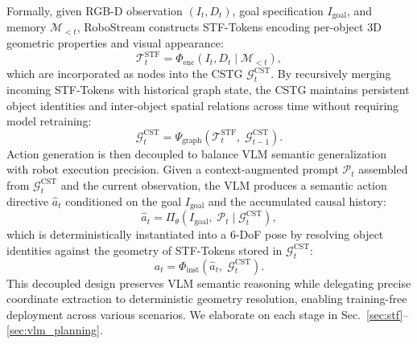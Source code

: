 Formally, given RGB-D observation $(I_t, D_t)$, goal specification $I_{\text{goal}}$, and memory $\mathcal{M}_{<t}$, RoboStream constructs STF-Tokens encoding per-object 3D geometric properties and visual appearance:
\begin{equation}
    \mathcal{T}_t^{\text{STF}} = \Phi_{\text{enc}}(I_t, D_t \mid \mathcal{M}_{<t}),
\end{equation}
which are incorporated as nodes into the CSTG $\mathcal{G}_t^{\text{CST}}$. By recursively merging incoming STF-Tokens with historical graph state, the CSTG maintains persistent object identities and inter-object spatial relations across time without requiring model retraining:
\begin{equation}
    \mathcal{G}_t^{\text{CST}} = \Psi_{\text{graph}}(\mathcal{T}_t^{\text{STF}},\; \mathcal{G}_{t-1}^{\text{CST}}).
\end{equation}
Action generation is then decoupled to balance VLM semantic generalization with robot execution precision. Given a context-augmented prompt $\mathcal{P}_t$ assembled from $\mathcal{G}_t^{\text{CST}}$ and the current observation, the VLM produces a semantic action directive $\hat{a}_t$ conditioned on the goal $I_{\text{goal}}$ and the accumulated causal history:
\begin{equation}
    \hat{a}_t = \Pi_{\theta}(I_{\text{goal}},\; \mathcal{P}_t \mid \mathcal{G}_t^{\text{CST}}),
    \label{eq:action_directive}
\end{equation}
which is deterministically instantiated into a 6-DoF pose by resolving object identities against the geometry of STF-Tokens stored in $\mathcal{G}_t^{\text{CST}}$:
\begin{equation}
    a_t = \Phi_{\text{inst}}(\hat{a}_t,\; \mathcal{G}_t^{\text{CST}}).
\end{equation}
This decoupled design preserves VLM semantic reasoning while delegating precise coordinate extraction to deterministic geometry resolution, enabling training-free deployment across various scenarios. We elaborate on each stage in Sec.~\ref{sec:stf}--\ref{sec:vlm_planning}.






